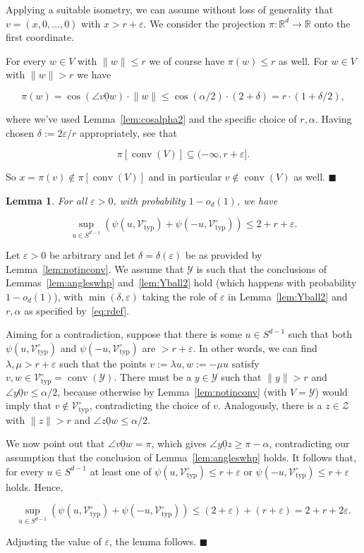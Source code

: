 \documentclass[11pt]{article}%
\newenvironment{proof}{\vspace{1ex}\noindent{\bf Proof.}}{\hspace*{\fill}$\blacksquare$\vspace{1ex}}
\newtheorem{lemma} [theorem] {Lemma}%
\newcommand{\Vcal}[0]{\ensuremath{{\mathcal V}}}
\newcommand{\Ycal}[0]{\ensuremath{{\mathcal Y}}}
\newcommand{\Zcal}[0]{\ensuremath{{\mathcal Z}}}
\newcommand{\eR}[0]{\ensuremath{ \mathbb R}}
\newcommand{\norm}[1]{\ensuremath{\|#1\|}}
\newcommand{\eps}{\varepsilon}
\newcommand{\orig}{\underline{0}}
\DeclareMathOperator{\conv}{conv}
\newcommand{\Vtyp}[0]{\Vcal_{\text{typ}}}
\begin{document}
\begin{proof}
Applying a suitable isometry, we can assume without loss of generality that $v = (x,0,\dots,0)$ with $x>r+\eps$. 
We consider the projection $\pi : \eR^d \to \eR$ onto the first coordinate.

For every $w \in V$ with $\norm{w} \leq r$ we of course have $\pi(w) \leq r$ as well.
For $w \in V$ with $\norm{w} > r$ we have

$$ \pi(w) = \cos\left( \angle v{\orig}w \right) \cdot \norm{w} \leq \cos(\alpha/2) \cdot (2+\delta)
= r \cdot (1+\delta/2), $$

\noindent
where we've used Lemma~\ref{lem:cosalpha2} and the specific choice of $r,\alpha$.
Having chosen $\delta := 2\eps/r$ appropriately, see that 

$$ \pi[ \conv(V) ] \subseteq (-\infty,r+\eps]. $$

\noindent 
So $x = \pi(v) \not\in \pi[ \conv(V) ]$ and in particular $v\not\in \conv(V)$ as well.
\end{proof}

\begin{lemma}\label{lem:prev}
 For all $\eps>0$, with probability $1-o_d(1)$, we have 
 
 $$ \sup_{u \in S^{d-1}} \left( \psi(u,\Vtyp^{\circ}) + \psi(-u,\Vtyp^{\circ}) \right) \leq 2 + r + \eps. $$
 
\end{lemma}

\begin{proof}
Let $\eps>0$ be arbitrary and let $\delta=\delta(\eps)$ be as provided by Lemma~\ref{lem:notinconv}.
We assume that $\Ycal$ is such that the conclusions of Lemmas~\ref{lem:angleswhp} and~\ref{lem:Yball2} hold  
(which happens with probability $1-o_d(1)$), with 
$\min(\delta,\eps)$ taking the role of $\eps$ in Lemma~\ref{lem:Yball2}
and $r,\alpha$ as specified by~\eqref{eq:rdef}.

Aiming for a contradiction, suppose that there is some $u \in S^{d-1}$ such that both 
$\psi(u,\Vtyp^{\circ})$ and $\psi(-u,\Vtyp^{\circ})$ are $> r+\eps$.
In other words, we can find $\lambda,\mu > r+\eps$ such that the points $v := \lambda u, w := -\mu u$
satisfy $v,w \in \Vtyp^{\circ} = \conv(\Ycal)$.
There must be a $y\in\Ycal$ such that 
$\norm{y} > r$ and $\angle y\orig v\leq \alpha/2$, because otherwise
by Lemma~\ref{lem:notinconv} (with $V=\Ycal$) would imply that $v \not\in \Vtyp^{\circ}$, contradicting the 
choice of $v$.
Analogously, there is a $z\in \Zcal$ with $\norm{z}>r$ and $\angle z\orig w\leq \alpha/2$.

We now point out that $\angle v\orig w = \pi$, which gives $\angle y\orig z \geq \pi-\alpha$, contradicting 
our assumption that the conclusion of Lemma~\ref{lem:angleswhp} holds.
It follows that, for every $u \in S^{d-1}$ at least one of $\psi(u,\Vtyp^{\circ}) \leq r+\eps$ or $\psi(-u,\Vtyp^{\circ}) \leq r+\eps$
holds.
Hence,
 
$$ \sup_{u \in S^{d-1}} \left( \psi(u,\Vtyp^{\circ}) + \psi(-u,\Vtyp^{\circ}) \right) \leq (2 + \eps) + (r + \eps) = 2 + r + 2\eps. $$

\noindent
Adjusting the value of $\eps$, the lemma follows.
\end{proof}
\end{document}
